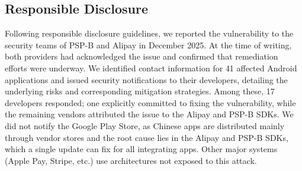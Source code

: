 \subsection{Responsible Disclosure}
Following responsible disclosure guidelines, we reported the vulnerability to the security teams of PSP-B and Alipay in December 2025. 
At the time of writing, both providers had acknowledged the issue and confirmed that remediation efforts were underway. 
We identified contact information for 41 affected Android applications and issued security notifications to their developers, detailing the underlying risks and corresponding mitigation strategies.
Among these, 17 developers responded; one explicitly committed to fixing the vulnerability, while the remaining vendors attributed the issue to the Alipay and PSP-B SDKs.
We did not notify the Google Play Store, as Chinese apps are distributed mainly through vendor stores and the root cause lies in the Alipay and PSP-B SDKs, which a single update can fix for all integrating apps. Other major systems (Apple Pay, Stripe, etc.) use architectures not exposed to this attack.
